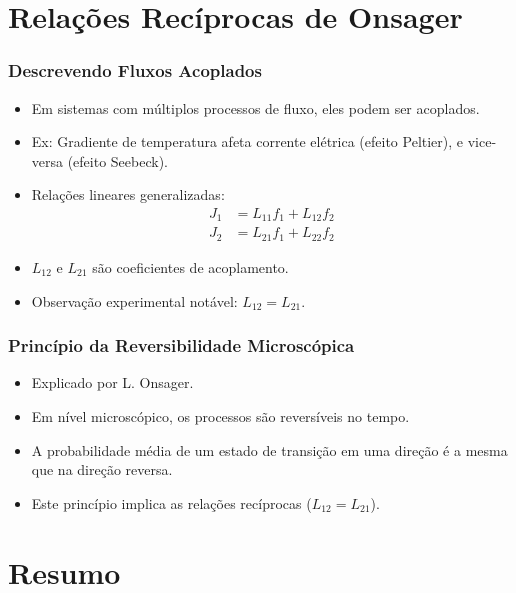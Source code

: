 \documentclass[11pt]{beamer}
\begin{document}
\section{Relações Recíprocas de Onsager}

\begin{frame}
    \frametitle{Descrevendo Fluxos Acoplados}
    \begin{itemize}
        \item Em sistemas com múltiplos processos de fluxo, eles podem ser acoplados.
        \item Ex: Gradiente de temperatura afeta corrente elétrica (efeito Peltier), e vice-versa (efeito Seebeck).
        \item Relações lineares generalizadas:
        \begin{align*} J_1 &= L_{11}f_1 + L_{12}f_2 \\ J_2 &= L_{21}f_1 + L_{22}f_2 \end{align*}
        \item $L_{12}$ e $L_{21}$ são coeficientes de acoplamento.
        \item Observação experimental notável: $L_{12} = L_{21}$.
    \end{itemize}
\end{frame}

\begin{frame}
    \frametitle{Princípio da Reversibilidade Microscópica}
    \begin{itemize}
        \item Explicado por L. Onsager.
        \item Em nível microscópico, os processos são reversíveis no tempo.
        \item A probabilidade média de um estado de transição em uma direção é a mesma que na direção reversa.
        \item Este princípio implica as relações recíprocas ($L_{12} = L_{21}$).
    \end{itemize}
\end{frame}

\section{Resumo}
\end{document}

